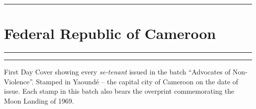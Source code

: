 \documentclass[a4paper]{article}
\begin{document}
\begin{landscape}
  \hrule
\section*{Federal Republic of Cameroon}
\vspace{8pt}
\hrule
\vspace{6cm}
\hfill
\begin{minipage}{4cm}
  \hrule \vspace{12pt} First Day Cover showing every {\it se-tenant}
  issued in the batch ``Advocates of Non-Violence''. Stamped in
  Yaound\'{e} -- the capital city of Cameroon on the date of issue.
  Each stamp in this batch also bears the overprint commemorating the
  Moon Landing of 1969.
\end{minipage}


\end{landscape}
\end{document}
